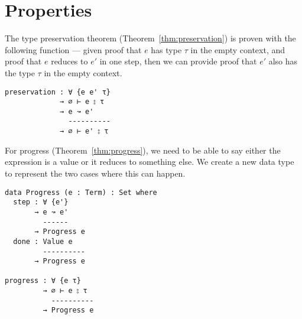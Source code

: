 \section{Properties}
The type preservation theorem (Theorem~\ref{thm:preservation}) is proven
with the following function --- given proof that $e$ has type $\tau$ in the
empty context, and proof that $e$ reduces to $e'$ in one step, then we
can provide proof that $e'$ also has the type $\tau$ in the empty context.
\begin{verbatim}
preservation : ∀ {e e' τ}
             → ∅ ⊢ e ⦂ τ
             → e ↝ e'
               ----------
             → ∅ ⊢ e' ⦂ τ
\end{verbatim}
For progress (Theorem~\ref{thm:progress}), we need to be able to say
either the expression is a value or it reduces to something else. We
create a new data type to represent the two cases where this can
happen.
\begin{verbatim}
data Progress (e : Term) : Set where
  step : ∀ {e'}
       → e ↝ e'
         ------
       → Progress e
  done : Value e
         ----------
       → Progress e

progress : ∀ {e τ}
         → ∅ ⊢ e ⦂ τ
           ----------
         → Progress e
\end{verbatim}